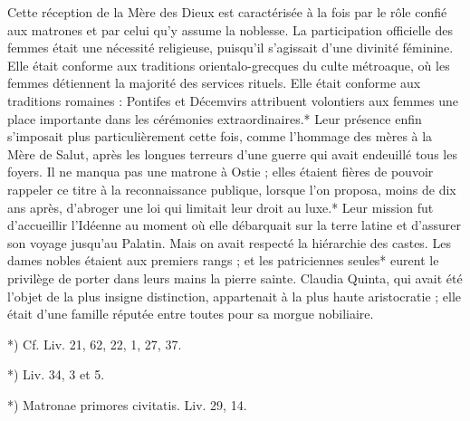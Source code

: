 \documentclass[a4paper, 11pt, oneside, polutonikogreek, french]{article}
\begin{document}
Cette réception de la Mère des Dieux est caractérisée à la fois par le rôle confié aux matrones et par celui qu'y assume la noblesse. La participation officielle des femmes était une nécessité religieuse, puisqu'il s'agissait d'une divinité féminine. Elle était conforme aux traditions orientalo-grecques du culte métroaque, où les femmes détiennent la majorité des services rituels. Elle était conforme aux traditions romaines : Pontifes et Décemvirs attribuent volontiers aux femmes une place importante dans les cérémonies extraordinaires.* Leur présence enfin s'imposait plus particulièrement cette fois, comme l'hommage des mères à la Mère de Salut, après les longues terreurs d'une guerre qui avait endeuillé tous les foyers. Il ne manqua pas une matrone à Ostie ; elles étaient fières de pouvoir rappeler ce titre à la reconnaissance publique, lorsque l'on proposa, moins de dix ans après, d'abroger une loi qui limitait leur droit au luxe.* Leur mission fut d'accueillir l'Idéenne au moment où elle débarquait sur la terre latine et d'assurer son voyage jusqu'au Palatin. Mais on avait respecté la hiérarchie des castes. Les dames nobles étaient aux premiers rangs ; et les patriciennes seules* eurent le privilège de porter dans leurs mains la pierre sainte. Claudia Quinta, qui avait été l'objet de la plus insigne distinction, appartenait à la plus haute aristocratie ; elle était d'une famille réputée entre toutes pour sa morgue nobiliaire.

*) Cf. Liv. 21, 62, 22, 1, 27, 37.

*) Liv. 34, 3 et 5.

*) Matronae primores civitatis. Liv.  29, 14.
\end{document}
